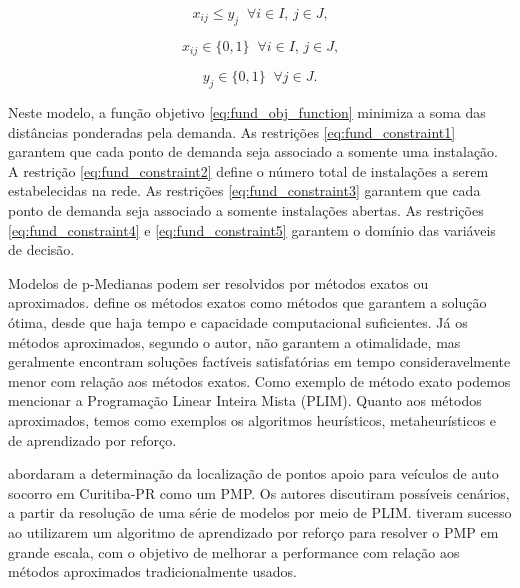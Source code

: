 \begin{equation} \label{eq:fund_constraint3}
x_{ij} \leq y_j \;\; \forall i \in I \text{, }j \in J\text{,}
\end{equation}

\begin{equation} \label{eq:fund_constraint4}
x_{ij} \in \{0,1\} \;\; \forall i \in I \text{, }j \in J\text{,}
\end{equation}

\begin{equation} \label{eq:fund_constraint5}
y_j \in \{0,1\} \;\; \forall j \in J\text{.}
\end{equation}

Neste modelo, a função objetivo \ref{eq:fund_obj_function} minimiza a soma das distâncias ponderadas pela demanda. As restrições \ref{eq:fund_constraint1} garantem que cada ponto de demanda seja associado a somente uma instalação. A restrição \ref{eq:fund_constraint2} define o número total de instalações a serem estabelecidas na rede. As restrições \ref{eq:fund_constraint3} garantem que cada ponto de demanda seja associado a somente instalações abertas. As restrições \ref{eq:fund_constraint4} e \ref{eq:fund_constraint5} garantem o domínio das variáveis de decisão.

Modelos de p-Medianas podem ser resolvidos por métodos exatos ou aproximados. \textcite{Judecir2021} define os métodos exatos como métodos que garantem a solução ótima, desde que haja tempo e capacidade computacional suficientes. Já os métodos aproximados, segundo o autor, não garantem a otimalidade, mas geralmente encontram soluções factíveis satisfatórias em tempo consideravelmente menor com relação aos métodos exatos. Como exemplo de método exato podemos mencionar a Programação Linear Inteira Mista (PLIM). Quanto aos métodos aproximados, temos como exemplos os algoritmos heurísticos, metaheurísticos e de aprendizado por reforço.


\textcite{Nery2021} abordaram a determinação da localização de pontos apoio para veículos de auto socorro em Curitiba-PR como um PMP. Os autores discutiram possíveis cenários, a partir da resolução de uma série de modelos por meio de PLIM. \textcite{Wang2022} tiveram sucesso ao utilizarem um algoritmo de aprendizado por reforço para resolver o PMP em grande escala, com o objetivo de melhorar a performance com relação aos métodos aproximados tradicionalmente usados.

